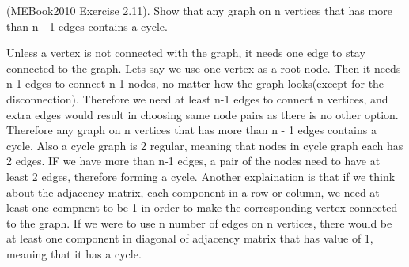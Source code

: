 \documentclass{article}
\begin{document}
\begin{problem}
    (MEBook2010 Exercise 2.11). Show that any graph on n vertices that has more than n - 1 edges contains a cycle.
\end{problem}
    Unless a vertex is not connected with the graph, it needs one edge to stay connected to the graph. Lets say we use one vertex as a root node. Then it needs n-1 edges to connect n-1 nodes, no matter how the graph looks(except for the disconnection). Therefore we need at least n-1 edges to connect n vertices, and extra edges would result in choosing same node pairs as there is no other option. Therefore any graph on n vertices that has more than n - 1 edges contains a cycle.
    Also a cycle graph is 2 regular, meaning that nodes in cycle graph each has 2 edges. IF we have more than n-1 edges, a pair of the nodes need to have at least 2 edges, therefore forming a cycle. 
    Another explaination is that if we think about the adjacency matrix, each component in a row or column, we need at least one compnent to be 1 in order to make the corresponding vertex connected to the graph. If we were to use n number of edges on n vertices, there would be at least one component in diagonal of adjacency matrix that has value of 1, meaning that it has a cycle. 
\end{document}
